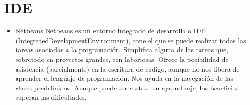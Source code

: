 		\section{IDE}
		\begin{itemize}
			\item  Netbeans 
			\label{Herramientas}
			\newline
			Netbeans es un entorno integrado de desarrollo o IDE (IntegratedDevelopmentEnvironment), cone el que se puede realizar todas las tareas asociadas a la programación.
			\newline
			Simplifica alguna de las tareas que, sobretodo en proyectos grandes, son laboriosas. Ofrece la posibilidad de asistencia (parcialmente) en la escritura de código, aunque no nos libera de aprender el lenguaje de programación.
			Nos ayuda en la navegación de las clases predefinidas.
			Aunque puede ser costoso su aprendizaje, los beneficios superan las dificultades.
			

\end{itemize}
